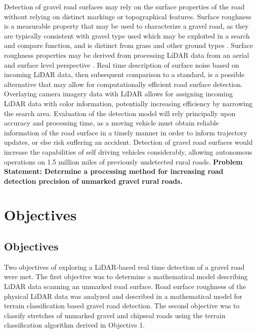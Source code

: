 \documentclass[numbered,pdftex]{ohio-etd}
\begin{document}
{	{Detection of gravel road surfaces may rely on the surface properties of the road without relying on distinct markings or topographical features. Surface roughness is a measurable property that may be used to characterize a gravel road, as they are typically consistent with gravel type used \cite{skorseth_gravel_nodate} which may be exploited in a search and compare function, and is distinct from grass and other ground types \cite{wan_road_2007, levi_3d_2012_light, levi_3d_2012_terrain}. Surface roughness properties may be derived from processing LiDAR data from an aerial and surface level perspective \cite{wan_road_2007, levi_3d_2012_light, levi_3d_2012_terrain, pollyea_experimental_2012,rychkov_computational_2012,lague_accurate_2013,brubaker_use_2013,turner_estimation_2014,campbell_lidar-based_2017,shepard_roughness_2001,tegowski_statistical_2016,sock_probabilistic_2016,milenkovic_roughness_2018,yadav_extraction_2017, yadav_rural_2018}. Real time description of surface noise based on incoming LiDAR data, then subsequent comparison to a standard, is a possible alternative that may allow for computationally efficient road surface detection. Overlaying camera imagery data with LiDAR allows for assigning incoming LiDAR data with color information, potentially increasing efficiency by narrowing the search area. Evaluation of the detection model will rely principally upon accuracy and processing time, as a moving vehicle must obtain reliable information of the road surface in a timely manner in order to inform trajectory updates, or else risk suffering an accident. Detection of gravel road surfaces would increase the capabilities of self driving vehicles considerably, allowing autonomous operations on 1.5 million miles \cite{road_stats_2} of previously undetected rural roads. \textbf{Problem Statement: Determine a processing method for increasing road detection precision of unmarked gravel rural roads.} 
	
}

\chapter{Objectives}

\section{Objectives}

	{Two objectives of exploring a LiDAR-based real time detection of a gravel road were met. The first objective was to determine a mathematical model describing LiDAR data scanning an unmarked road surface. Road surface roughness of the physical LiDAR data was analyzed and described in a mathematical model for terrain classification based gravel road detection. The second objective was to classify stretches of unmarked gravel and chipseal roads using the terrain classification algorithm derived in Objective 1.}

}
\end{document}
